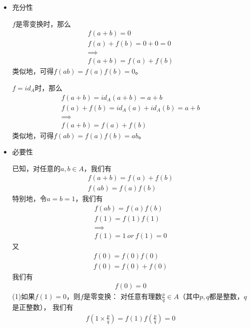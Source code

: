 \documentclass{article}
\begin{document}
\begin{itemize}
      \item 充分性

            $f$是零变换时，那么
            \begin{align*}
                  f(a + b) = 0            \\
                  f(a) + f(b) = 0 + 0 = 0 \\
                  \implies                \\
                  f(a + b) = f(a) + f(b)
            \end{align*}
            类似地，可得$f(ab) = f(a)f(b) = 0$。

            $f = id_A$时，那么
            \begin{align*}
                  f(a + b) = id_A(a + b) = a + b          \\
                  f(a) + f(b) = id_A(a) + id_A(b) = a + b \\
                  \implies                                \\
                  f(a + b) = f(a) + f(b)
            \end{align*}
            类似地，可得$f(ab) = f(a)f(b) = ab$。

      \item 必要性

            已知，对任意的$a, b \in A$，我们有
            \begin{align*}
                  f(a + b) = f(a) + f(b) \\
                  f(ab) = f(a)f(b)
            \end{align*}
            特别地，令$a = b = 1$，我们有
            \begin{align*}
                  f(ab) = f(a) f(b) \\
                  f(1) = f(1) f(1)  \\
                  \implies          \\
                  f(1) = 1 \ or \ f(1) = 0
            \end{align*}
            又
            \begin{align*}
                  f(0) = f(0)f(0) \\
                  f(0) = f(0) + f(0)
            \end{align*}
            我们有
            \begin{align*}
                  f(0) = 0
            \end{align*}
            (1)如果$f(1) = 0$，则$f$是零变换：
            对任意有理数$\frac{p}{q} \in A$（其中$p, q$都是整数，$q$是正整数），
            我们有
            \begin{align*}
                  f(1 \times \frac{p}{q}) = f(1)  f(\frac{p}{q}) = 0
            \end{align*}


\end{itemize}
\end{document}
